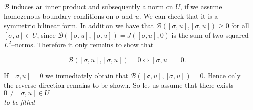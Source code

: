 \documentclass[../draft_1.tex]{subfiles}
\begin{document}
\smallskip
\\
$\mathcal{B}$ induces an inner product and subsequently a norm on $U$, if we assume homogenous boundary conditions on $\sigma$ and $u$. We can check that it is a symmetric bilinear form. In addition we have that $ \mathcal{B} ([\sigma, u], [\sigma, u]) \geq 0 $ for all $[\sigma, u] \in U$, since $ \mathcal{B} ([\sigma, u], [\sigma, u]) = J([\sigma, u], 0)$ is the sum of two squared $L^2$--norms. Therefore it only remains to show that 
\begin{ceqn}
	\begin{equation}
 \mathcal{B} ([\sigma, u], [\sigma, u]) = 0 \iff [\sigma, u] = 0 .  
	\end{equation}
\end{ceqn}
If $[\sigma, u] = 0$ we immediately obtain that $ \mathcal{B} ([\sigma, u], [\sigma, u]) = 0$. Hence only the reverse direction remains to be shown. So let us assume that there exists $0 \neq [\sigma, u] \in U$ \\
\textit{to be filled}\\
\end{document}
